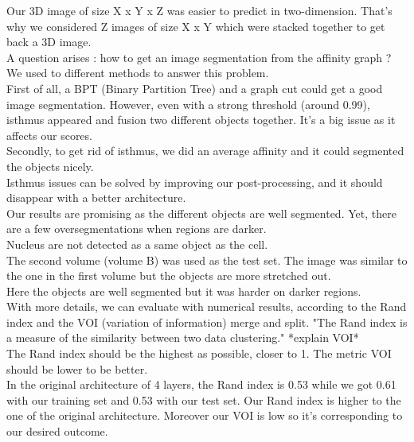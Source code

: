 Our 3D image of size X x Y x Z was easier to predict in two-dimension. 
That's why we considered Z images of size X x Y which were stacked together to get back a 3D image.\\


A question arises : how to get an image segmentation from the affinity graph ?\\

We used to different methods to answer this problem.\\
First of all, a BPT (Binary Partition Tree) and a graph cut could get a good image segmentation. 
However, even with a strong threshold (around 0.99), isthmus appeared and fusion two different objects together.
It's a big issue as it affects our scores.\\
Secondly, to get rid of isthmus, we did an average affinity and it could segmented the objects nicely.\\
Isthmus issues can be solved by improving our post-processing, and it should disappear with a better architecture.\\

Our results are promising as the different objects are well segmented. 
Yet, there are a few oversegmentations when regions are darker.\\ 
Nucleus are not detected as a same object as the cell.\\

The second volume (volume B) was used as the test set.
The image was similar to the one in the first volume but the objects are more stretched out.\\
Here the objects are well segmented but it was harder on darker regions.\\

With more details, we can evaluate with numerical results, according to the Rand index and the VOI (variation of information) merge and split. 
"The Rand index is a measure of the similarity between two data clustering."
*explain VOI*\\
The Rand index should be the highest as possible, closer to 1. 
The metric VOI should be lower to be better.\\

In the original architecture of 4 layers, the Rand index is 0.53 while we got 0.61 with our training set and 0.53 with our test set.
Our Rand index is higher to the one of the original architecture.
Moreover our VOI is low so it's corresponding to our desired outcome.\\


